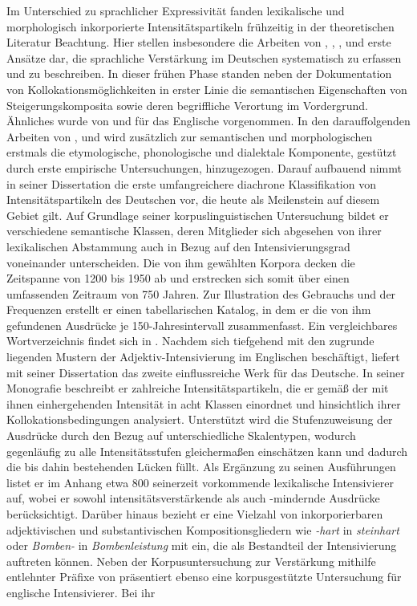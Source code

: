 Im Unterschied zu sprachlicher Expressivität fanden lexikalische und morphologisch inkorporierte Intensitätspartikeln frühzeitig in der theoretischen Literatur Beachtung. Hier stellen insbesondere die Arbeiten von {\citet[]{Tobler.1868}}, \citet[]{Hauschild.1899,Hauschild.1929}, \citet[]{Mueller.1899}, {\citet[]{Becher.1907}} und \citet[]{Baumgarten.1908} erste Ansätze dar, die sprachliche Verstärkung im Deutschen systematisch zu erfassen und zu beschreiben. In dieser frühen Phase standen neben der Dokumentation von Kollokationsmöglichkeiten in erster Linie die semantischen Eigenschaften von Steigerungskomposita sowie deren begriffliche Verortung im Vordergrund. Ähnliches wurde von \citet[]{Stoffel.1901} und {\citet[]{Borst.1902}} für das Englische vorgenommen. In den darauffolgenden Arbeiten von \citet[]{Berz.1953}, \citet[]{Sachs.1963} und {\citet[]{Lipka.1966, Lipka.1968}} wird zusätzlich zur semantischen und morphologischen erstmals die etymologische, phonologische und dialektale Komponente, gestützt durch erste empirische Untersuchungen, hinzugezogen. Darauf aufbauend nimmt {\citet[]{Biedermann.1969}} in seiner Dissertation die erste umfangreichere diachrone Klassifikation von Intensitätspartikeln des Deutschen vor, die heute als Meilenstein auf diesem Gebiet gilt. Auf Grundlage seiner korpuslinguistischen Untersuchung bildet er verschiedene semantische Klassen, deren Mitglieder sich abgesehen von ihrer lexikalischen Abstammung auch in Bezug auf den Intensivierungsgrad voneinander unterscheiden. Die von ihm gewählten Korpora decken die Zeitspanne von 1200 bis 1950 ab und erstrecken sich somit über einen umfassenden Zeitraum von 750 Jahren. Zur Illustration des Gebrauchs und der Frequenzen erstellt er einen tabellarischen Katalog, in dem er die von ihm gefundenen Ausdrücke je 150-Jahresintervall zusammenfasst. Ein vergleichbares Wortverzeichnis findet sich in \citet[]{Tobler.1868}. Nachdem sich \citet[]{Bolinger.1972} tiefgehend mit den zugrunde liegenden Mustern der Adjektiv-Intensivierung im Englischen beschäftigt, liefert \citet[]{Os.1989} mit seiner Dissertation das zweite einflussreiche Werk für das Deutsche. In seiner Monografie beschreibt er zahlreiche Intensitätspartikeln, die er gemäß der mit ihnen einhergehenden Intensität in acht Klassen einordnet und hinsichtlich ihrer Kollokationsbedingungen analysiert. Unterstützt wird die Stufenzuweisung der Ausdrücke durch den Bezug auf unterschiedliche Skalentypen, wodurch {\citet[]{Os.1989}} gegenläufig zu {\citet[]{Biedermann.1969}} alle Intensitätsstufen gleichermaßen einschätzen kann und dadurch die bis dahin bestehenden Lücken füllt. Als Ergänzung zu seinen Ausführungen listet er im Anhang etwa 800 seinerzeit vorkommende lexikalische Intensivierer auf, wobei er sowohl intensitätsverstärkende als auch -mindernde Ausdrücke berücksichtigt. Darüber hinaus bezieht er eine Vielzahl von inkorporierbaren adjektivischen und substantivischen Kompositionsgliedern wie \textit{-hart} in \textit{steinhart} oder \textit{Bomben-} in \textit{Bombenleistung} mit ein, die als Bestandteil der Intensivierung auftreten können. Neben der Korpusuntersuchung zur Verstärkung mithilfe entlehnter Präfixe von {\citet[]{Ruf.1996}} präsentiert ebenso {\citet[]{Paradis.1997}} eine korpusgestützte Untersuchung für englische Intensivierer. Bei ihr 
